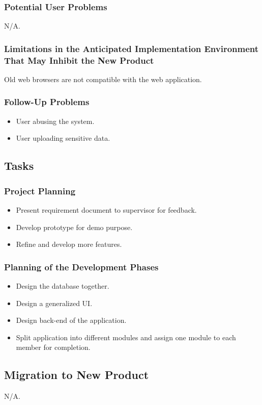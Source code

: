 \documentclass[12pt]{article}
\begin{document}
{\subsubsection{Potential User Problems}
N/A.
\subsubsection{Limitations in the Anticipated Implementation Environment That 
May Inhibit the New Product}
Old web browsers are not compatible with the web application.
\subsubsection{Follow-Up Problems}
\begin{itemize}
  \item User abusing the system.
  \item User uploading sensitive data.
\end{itemize}

\subsection{Tasks}
\subsubsection{Project Planning}
\begin{itemize}
  \item Present requirement document to supervisor for feedback.
  \item Develop prototype for demo purpose.
  \item Refine and develop more features.
\end{itemize}
\subsubsection{Planning of the Development Phases}
\begin{itemize}
    \item Design the database together.
    \item Design a generalized UI.
    \item Design back-end of the application.
    \item Split application into different modules and assign one module to each 
member for completion.
\end{itemize}

\subsection{Migration to New Product}
N/A.

}
\end{document}
